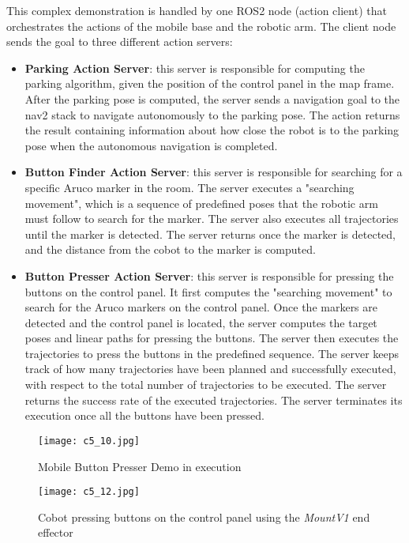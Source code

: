 This complex demonstration is handled by one ROS2 node (action client) that orchestrates the actions of the mobile base
and the robotic arm. The client node sends the goal to three different action servers:

\begin{itemize}
    \item \textbf{Parking Action Server}: this server is responsible for computing the parking algorithm, given the
    position of the control panel in the map frame. After the parking pose is computed, the server sends a navigation
    goal to the nav2 stack to navigate autonomously to the parking pose. The action returns the result containing
    information about how close the robot is to the parking pose when the autonomous navigation is completed.
    \item \textbf{Button Finder Action Server}: this server is responsible for searching for a specific Aruco marker
    in the room. The server executes a "searching movement", which is a sequence of predefined poses that the robotic arm
    must follow to search for the marker. The server also executes all trajectories until the marker is detected.
    The server returns once the marker is detected, and the distance from the cobot to the marker is computed.
    \item \textbf{Button Presser Action Server}: this server is responsible for pressing the buttons on the control panel.
    It first computes the "searching movement" to search for the Aruco markers on the control panel.
    Once the markers are detected and the control panel is located, the server computes the target poses and linear paths
    for pressing the buttons. The server then executes the trajectories to press the buttons in the predefined sequence.
    The server keeps track of how many trajectories have been planned and successfully executed, with respect to
    the total number of trajectories to be executed. The server returns the success rate of the executed trajectories.
    The server terminates its execution once all the buttons have been pressed.
\end{itemize}

\begin{figure}[t]
    \centering
    \texttt{[image: c5\_10.jpg]}
    \caption{Mobile Button Presser Demo in execution}
    \label{fig:buttonpresser1}
\end{figure}

\begin{figure}[t]
    \centering
    \texttt{[image: c5\_12.jpg]}
    \caption{Cobot pressing buttons on the control panel using the \textit{MountV1} end effector}
    \label{fig:buttonpresser2}
\end{figure}

